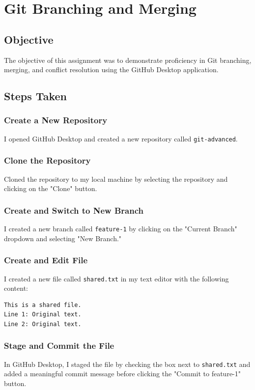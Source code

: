 \section{Git Branching and Merging}

\subsection{Objective}
The objective of this assignment was to demonstrate proficiency in Git branching, merging, and conflict resolution using the GitHub Desktop application.

\subsection{Steps Taken}

\subsubsection{Create a New Repository}
I opened GitHub Desktop and created a new repository called \texttt{git-advanced}.

\subsubsection{Clone the Repository}
Cloned the repository to my local machine by selecting the repository and clicking on the "Clone" button.

\subsubsection{Create and Switch to New Branch}
I created a new branch called \texttt{feature-1} by clicking on the "Current Branch" dropdown and selecting "New Branch."

\subsubsection{Create and Edit File}
I created a new file called \texttt{shared.txt} in my text editor with the following content:
\begin{verbatim}
This is a shared file.
Line 1: Original text.
Line 2: Original text.
\end{verbatim}

\subsubsection{Stage and Commit the File}
In GitHub Desktop, I staged the file by checking the box next to \texttt{shared.txt} and added a meaningful commit message before clicking the "Commit to feature-1" button.


